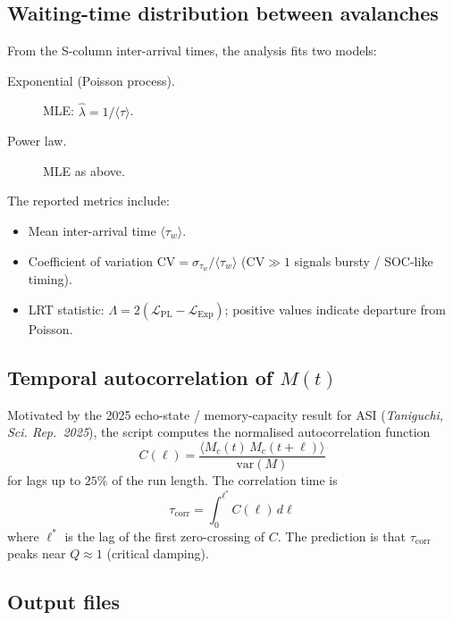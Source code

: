 \documentclass[11pt,a4paper]{article}
\begin{document}
\subsection{Waiting-time distribution between avalanches}
\label{sec:waiting_time}

From the S-column inter-arrival times, the analysis fits two models:

\begin{description}
  \item[Exponential (Poisson process).]  MLE: $\hat{\lambda} = 1/\langle\tau\rangle$.
  \item[Power law.]  MLE as above.
\end{description}

The reported metrics include:
\begin{itemize}
  \item Mean inter-arrival time $\langle\tau_w\rangle$.
  \item Coefficient of variation $\mathrm{CV} = \sigma_{\tau_w}/\langle\tau_w\rangle$
    ($\mathrm{CV} \gg 1$ signals bursty / SOC-like timing).
  \item LRT statistic: $\Lambda = 2(\mathcal{L}_{\mathrm{PL}} - \mathcal{L}_{\mathrm{Exp}})$;
    positive values indicate departure from Poisson.
\end{itemize}

\subsection{Temporal autocorrelation of $M(t)$}
\label{sec:autocorr}

Motivated by the 2025 echo-state / memory-capacity result for ASI
(\textit{Taniguchi, Sci. Rep.\ 2025}), the script computes the
normalised autocorrelation function
\begin{equation}
  C(\ell) = \frac{\langle M_c(t)\,M_c(t+\ell)\rangle}{\mathrm{var}(M)}
\end{equation}
for lags up to $25\%$ of the run length.  The correlation time is
\begin{equation}
  \tau_{\mathrm{corr}} = \int_0^{\ell^*} C(\ell)\,d\ell
\end{equation}
where $\ell^*$ is the lag of the first zero-crossing of $C$.
The prediction is that $\tau_{\mathrm{corr}}$ peaks near $Q \approx 1$
(critical damping).

\subsection{Output files}
\end{document}

